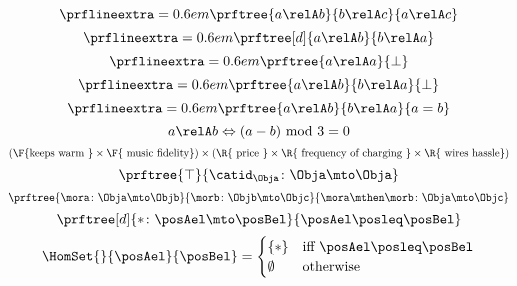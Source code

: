 {\begin{forslides}
\begin{equation*}
\end{equation*}
\begin{equation*}
    \label{eq:rel_tran}
    \prflineextra=0.6em
    \prftree{a\relA b}{b\relA c}{a\relA c}
\end{equation*}
\begin{equation*}
    \label{eq:rel_sym}
    \prflineextra=0.6em
    \prftree[d]{a \relA b}{b\relA a}
\end{equation*}
\begin{equation*}
    \label{eq:rel_irr}
    \prflineextra=0.6em
    \prftree{a \relA a}{\bot}
\end{equation*}
\begin{equation*}
    \label{eq:rel_asy}
    \prflineextra=0.6em
    \prftree{a \relA b}{b\relA a}{\bot}
\end{equation*}
\begin{equation*}
    \label{eq:rel_antisy}
    \prflineextra=0.6em
    \prftree{a \relA b}{b\relA a}{a=b}
\end{equation*}
    \begin{equation*}
    \label{eq:ex}
    a\relA b \Leftrightarrow (a-b) \text{ mod }3=0
\end{equation*}
    \begin{equation*}
        \label{eq:fun_cost}
        (\F{\text{keeps warm }}\times \F{\text{ music fidelity}})\times(\R{\text{ price }} \times \R{\text{ frequency of charging }}\times \R{\text{ wires hassle}})
\end{equation*}
    \begin{equation*}
        \label{eq:id_ex}
        \prftree{\top}{\catid_\Obja\colon \Obja \mto \Obja}
\end{equation*}
\begin{equation*}
\label{eq:comp_cat}
\prftree{\mora \colon \Obja \mto \Objb}{\morb\colon \Objb \mto \Objc}{\mora\mthen \morb \colon \Obja \mto \Objc}
\end{equation*}
\begin{equation*}
\label{eq:mor_pre}
\prftree[d]{\ast\colon \posAel \mto \posBel}{\posAel \posleq \posBel}
\end{equation*}
\begin{equation*}
\label{eq:hom_pre}
\HomSet{}{\posAel}{\posBel}=\begin{cases}\{\ast\} &\text{iff } \posAel \posleq \posBel\\
\emptyset &\text{otherwise}\end{cases}
\end{equation*}
 \begin{equation*}

\end{equation*}
\end{forslides}}
